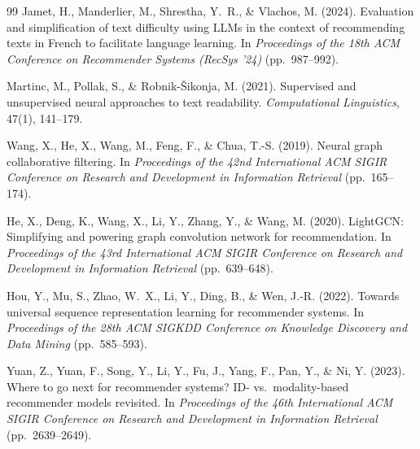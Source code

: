 \documentclass[11pt,a4paper]{article}
\newcommand{\mm}[1]{#1}
\newenvironment{mmblock}{}{}
\newcommand{\mmhl}[1]{#1}
\begin{document}
\vspace{-0.2cm}
\begin{thebibliography}{99}
\scriptsize
{}
Jamet, H., Manderlier, M., Shrestha, Y.~R., \& Vlachos, M. (2024).
Evaluation and simplification of text difficulty using {LLMs} in the context of recommending texts \mm{in French} to facilitate language learning.
In \textit{Proceedings of the 18th ACM Conference on Recommender Systems (RecSys '24)} (pp.\ \mmhl{987--992}).

Martinc, M., Pollak, S., \& Robnik-{\v{S}}ikonja, M. (2021).
Supervised and unsupervised neural approaches to text readability.
\textit{Computational Linguistics}, 47(1), 141--179.

\begin{mmblock}
Wang, X., He, X., Wang, M., Feng, F., \& Chua, T.-S. (2019).
Neural graph collaborative filtering.
In \textit{Proceedings of the 42nd International ACM SIGIR Conference on Research and Development in Information Retrieval} (pp.\ 165--174).

He, X., Deng, K., Wang, X., Li, Y., Zhang, Y., \& Wang, M. (2020).
{LightGCN}: Simplifying and powering graph convolution network for recommendation.
In \textit{Proceedings of the 43rd International ACM SIGIR Conference on Research and Development in Information Retrieval} (pp.\ 639--648).

Hou, Y., Mu, S., Zhao, W.~X., Li, Y., Ding, B., \& Wen, J.-R. (2022).
Towards universal sequence representation learning for recommender systems.
In \textit{Proceedings of the 28th ACM SIGKDD Conference on Knowledge Discovery and Data Mining} (pp.\ 585--593).

Yuan, Z., Yuan, F., Song, Y., Li, Y., Fu, J., Yang, F., Pan, Y., \& Ni, Y. (2023).
Where to go next for recommender systems? {ID}- vs.\ modality-based recommender models revisited.
In \textit{Proceedings of the 46th International ACM SIGIR Conference on Research and Development in Information Retrieval} (pp.\ 2639--2649).


\end{mmblock}
\end{thebibliography}
\end{document}
